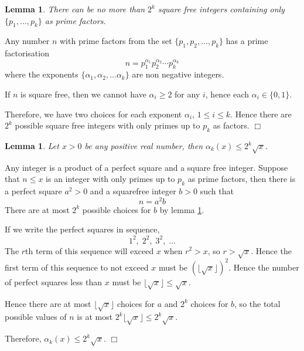 \documentclass[10pt]{article}
\newtheorem{lemma}[theorem]{Lemma}
\newenvironment{proof}[1][Proof]{\begin{trivlist}
\item[\hskip \labelsep {\bfseries #1}]}{\end{trivlist}}
\begin{document}
\begin{lemma}
\label{squarefree}
    There can be no more than $2^k$ square free integers
    containing only $\{p_1,\ldots,p_k\}$
    as prime factors.
\end{lemma}
\begin{proof}
    Any number $n$ with prime factors from the set $\{p_1,p_2,\ldots,p_k\}$
    has a prime factorisation
    \begin{equation*}
        n = p_1^{\alpha_1}p_2^{\alpha_2}\cdots p_k^{\alpha_k}
    \end{equation*}
    where the exponents $\{\alpha_1,\alpha_2,\ldots\alpha_k\}$
    are non negative integers.
    
    If $n$ is square free, then we cannot have $\alpha_i \geq 2$
    for any $i$, hence each $\alpha_i \in \{0,1\}$.
    
    Therefore, we have two choices for each exponent $\alpha_i$,
    $1\leq i\leq k$. Hence there are $2^k$ possible 
    square free integers with only primes up to
    $p_k$ as factors. $\Box$    
\end{proof}
\begin{lemma}
\label{alphaBound}
    Let $x>0$ be any positive real number, then $\alpha_k(x) \leq 2^k\sqrt{x}$.
\end{lemma}
\begin{proof}
    Any integer is a product of a perfect square and a square free
    integer. Suppose that $n \leq x$ is an integer
    with only primes up to $p_k$ as prime factors, then
    there is a perfect square $a^2>0$ and a squarefree integer $b > 0$ 
    such that
    \begin{equation*}
        n = a^2b
    \end{equation*}
    There are at most $2^k$ possible choices
    for $b$ by lemma \ref{squarefree}.
    
    If we write the perfect squares in sequence, 
    \begin{equation*}
        1^2,\;2^2,\;3^2,\;\ldots
    \end{equation*}
    The $r$th term of this sequence will exceed $x$ when $r^2 > x$,
    so $r > \sqrt{x}$. Hence the first term of this sequence
    to not exceed $x$ must be $(\lfloor\sqrt{x}\rfloor)^2$. Hence
    the number of perfect squares less than $x$ must be $\lfloor \sqrt{x}\rfloor \leq \sqrt{x}$.
    
    Hence there are at most $\lfloor\sqrt{x}\rfloor$ choices for $a$ and $2^k$ choices
    for $b$, so the total possible values of $n$ is at most $2^k\lfloor\sqrt{x}\rfloor \leq 2^k\sqrt{x}$.
    
    Therefore, $\alpha_k(x) \leq 2^k\sqrt{x}$. $\Box$
\end{proof}
\end{document}
